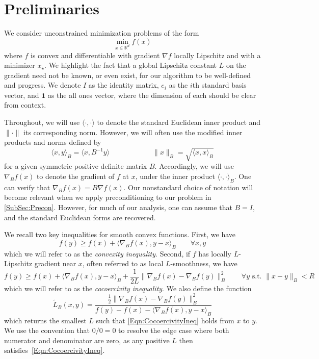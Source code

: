 \documentclass[11pt]{article}
\numberwithin{equation}{section}
\newcommand{\R}{\mathbb{R}}
\newcommand{\gradB}{\nabla_{\!\!{\scriptscriptstyle B}}}
\newcommand{\ones}{\mathbf{1}}
\newcommand{\dotB}[2]{\langle {#1}, {#2} \rangle_B}
\newcommand{\normB}[1]{\|{#1}\|_B}
\theoremstyle{definition}
\theoremstyle{plain}
\theoremstyle{definition}
\begin{document}
\section{Preliminaries} \label{Sec:Prelim}

We consider unconstrained minimization problems of the form
\begin{equation} \label{Eqn:MinimizeF}
    \min_{x \in \R^d} f(x)
\end{equation}
where $f$ is convex and differentiable with gradient $\nabla f$ locally Lipschitz and with a minimizer $x_\star$. We highlight the fact that a global Lipschitz constant $L$ on the gradient need not be known, or even exist, for our algorithm to be well-defined and progress. We denote $I$ as the identity matrix, $e_i$ as the $i$th standard basis vector, and $\ones$ as the all ones vector, where the dimension of each should be clear from context.

Throughout, we will use $\langle \cdot, \cdot \rangle$ to denote the standard Euclidean inner product and $\|\cdot \|$ its corresponding norm. However, we will often use the modified inner products and norms defined by
\begin{equation}
    \dotB{x}{y} = \langle x, B^{-1} y \rangle \qquad \qquad \qquad \normB{x} = \sqrt{\dotB{x}{x}}
\end{equation}
for a given symmetric positive definite matrix $B$. Accordingly, we will use $\gradB f(x)$ to denote the gradient of $f$ at $x$, under the inner product $\langle \cdot, \cdot \rangle_B$. One can verify that $\gradB f(x) = B \nabla f(x)$. 
Our nonstandard choice of notation will become relevant when we apply preconditioning to our problem in \cref{SubSec:Precon}. However, for much of our analysis, one can assume that $B=I$, and the standard Euclidean forms are recovered.

We recall two key inequalities for smooth convex functions. First, we have
\begin{equation}\label{Eqn:ConvexityIneq}
    f(y) \geq f(x) + \dotB{\gradB f(x)}{y-x} \qquad \forall x,y
\end{equation}
which we will refer to as the \textit{convexity inequality}. Second, if $f$ has locally $L$-Lipschitz gradient near $x$, often referred to as local $L$-smoothness, we have
\begin{equation}\label{Eqn:CocoercivityIneq}
    f(y) \geq f(x) + \dotB{\gradB f(x)}{y-x} + \frac{1}{2L} \normB{\gradB f(x) - \gradB f(y)}^2 \qquad \forall y \text{ s.t. } \normB{x-y} < R
\end{equation}
which we will refer to as the \textit{cocoercivity inequality}. We also define the function 
\begin{equation}
    \tilde{L}_B(x,y) = \frac{\frac{1}{2} \normB{\gradB f(x) - \gradB f(y)}^2}{f(y) - f(x) - \dotB{\gradB f(x)}{y-x} }
\end{equation}
which returns the smallest $L$ such that \eqref{Eqn:CocoercivityIneq} holds from $x$ to $y$. We use the convention that $0/0 = 0$ to resolve the edge case where both numerator and denominator are zero, as any positive $L$ then satisfies~\eqref{Eqn:CocoercivityIneq}.
\end{document}
